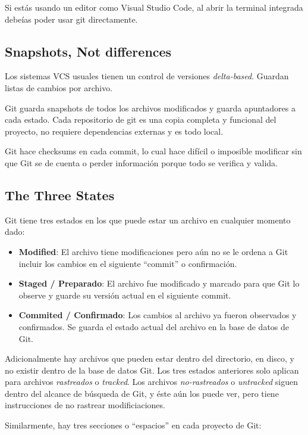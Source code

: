 \documentclass[spanish, 12pt, a4paper]{article}
\begin{document}
Si estás usando un editor como Visual Studio Code, al abrir la terminal
integrada debeías poder usar git directamente.

\subsection{Snapshots, Not differences}

Los sistemas VCS usuales tienen un control de versiones
\emph{delta-based}. Guardan listas de cambios por archivo.

Git guarda snapshots de todos los archivos modificados y guarda
apuntadores a cada estado. Cada repositorio de git es una copia completa
y funcional del proyecto, no requiere dependencias externas y es todo
local.

Git hace checksums en cada commit, lo cual hace difícil o imposible
modificar sin que Git se de cuenta o perder información porque todo se
verifica y valida.

\subsection{The Three States}

Git tiene tres estados en los que puede estar un archivo en cualquier
momento dado:

\begin{itemize}
\item
  \textbf{Modified}: El archivo tiene modificaciones pero
  aún no se le ordena a Git incluir los cambios en el siguiente ``commit''
  o confirmación.
\item
  \textbf{Staged / Preparado}: El archivo fue modificado y marcado para
  que Git lo observe y guarde su versión actual en el siguiente commit.
\item
  \textbf{Commited / Confirmado}: Los cambios al archivo ya fueron
  observados y confirmados. Se guarda el estado actual del archivo en la
  base de datos de Git.
\end{itemize}

Adicionalmente hay archivos que pueden estar dentro del directorio, en
disco, y no existir dentro de la base de datos Git. Los tres estados
anteriores solo aplican para archivos \emph{rastreados} o
\emph{tracked}. Los archivos \emph{no-rastreados} o \emph{untracked}
siguen dentro del alcance de búsqueda de Git, y éste aún los puede ver,
pero tiene instrucciones de no rastrear modificiaciones.

Similarmente, hay tres secciones o ``espacios'' en cada proyecto de Git:
\end{document}
